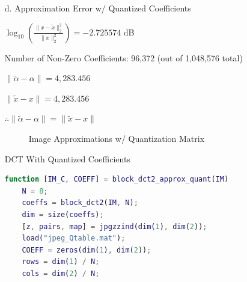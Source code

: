 \documentclass[12pt]{article}
\begin{document}
\begin{enumerate}
\begin{enumerate}
\newpage

\item[d.] Approximation Error w/ Quantized Coefficients

\begin{framed}
$\log_{10}(\frac{\|x-\tilde{x}\|_2^2}{\|x\|_2^2}) = -2.725574$ dB

Number of Non-Zero Coefficients: 96,372 (out of 1,048,576 total)

$\| \tilde{\alpha}-\alpha \| = 4,283.456$

$\| \tilde{x}-x \| = 4,283.456$

$\therefore \| \tilde{\alpha}-\alpha \| = \| \tilde{x}-x \|$
\end{framed}

\newpage

\begin{figure}[!ht]
    \caption{Image Approximations w/ Quantization Matrix}
    \centering
\end{figure}

DCT With Quantized Coefficients
\begin{lstlisting}[language=matlab]
function [IM_C, COEFF] = block_dct2_approx_quant(IM)
    N = 8;    
    coeffs = block_dct2(IM, N);
    dim = size(coeffs);
    [z, pairs, map] = jpgzzind(dim(1), dim(2));
    load("jpeg_Qtable.mat");
    COEFF = zeros(dim(1), dim(2));
    rows = dim(1) / N;
    cols = dim(2) / N;


\end{lstlisting}
\end{enumerate}
\end{enumerate}
\end{document}
